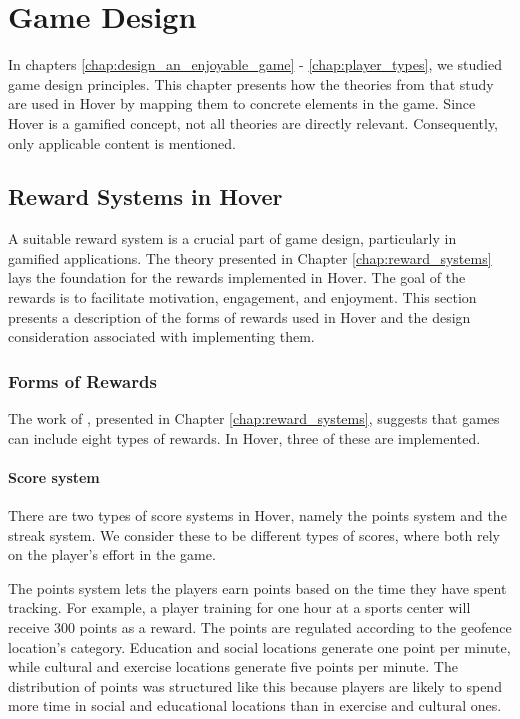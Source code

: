 \section{Game Design}
\label{chap:game_design}

In chapters \ref{chap:design_an_enjoyable_game} - \ref{chap:player_types}, we studied game design principles. This chapter presents how the theories from that study are used in Hover by mapping them to concrete elements in the game. Since Hover is a gamified concept, not all theories are directly relevant. Consequently, only applicable content is mentioned.

\subsection{Reward Systems in Hover}
A suitable reward system is a crucial part of game design, particularly in gamified applications. The theory presented in Chapter \ref{chap:reward_systems} lays the foundation for the rewards implemented in Hover. The goal of the rewards is to facilitate motivation, engagement, and enjoyment. This section presents a description of the forms of rewards used in Hover and the design consideration associated with implementing them. 

\subsubsection{Forms of Rewards}
The work of \citeauthor{wang_game_2011}, presented in Chapter \ref{chap:reward_systems}, suggests that games can include eight types of rewards. In Hover, three of these are implemented.

\paragraph*{Score system} 
There are two types of score systems in Hover, namely the points system and the streak system. We consider these to be different types of scores, where both rely on the player’s effort in the game.

The points system lets the players earn points based on the time they have spent tracking. For example, a player training for one hour at a sports center will receive 300 points as a reward. The points are regulated according to the geofence location’s category. Education and social locations generate one point per minute, while cultural and exercise locations generate five points per minute. The distribution of points was structured like this because players are likely to spend more time in social and educational locations than in exercise and cultural ones. 

